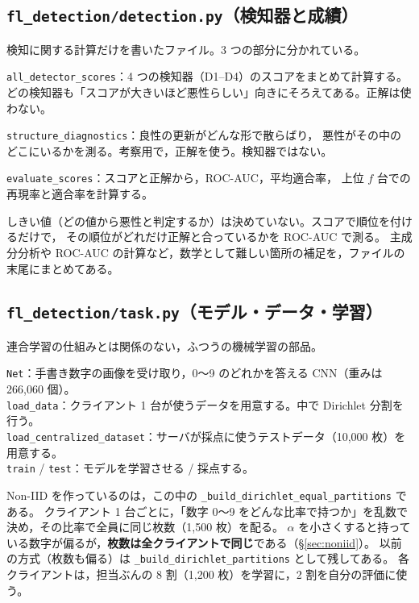\documentclass[a4j, dvipdfmx]{jsarticle}  %
\begin{document}
\subsection{\texttt{fl\_detection/detection.py}（検知器と成績）}

\begin{description}[leftmargin=1.4em, style=nextline]
  \item[役割] 検知に関する計算だけを書いたファイル。3 つの部分に分かれている。
  \item[1) 検知器] \texttt{all\_detector\_scores}：4 つの検知器（D1--D4）のスコアをまとめて計算する。
        どの検知器も「スコアが大きいほど悪性らしい」向きにそろえてある。正解は使わない。
  \item[2) 分布構造の診断指標] \texttt{structure\_diagnostics}：良性の更新がどんな形で散らばり，
        悪性がその中のどこにいるかを測る。考察用で，正解を使う。検知器ではない。
  \item[3) 検知性能指標] \texttt{evaluate\_scores}：スコアと正解から，ROC-AUC，平均適合率，
        上位 $f$ 台での再現率と適合率を計算する。
  \item[要点] しきい値（どの値から悪性と判定するか）は決めていない。スコアで順位を付けるだけで，
        その順位がどれだけ正解と合っているかを ROC-AUC で測る。
        主成分分析や ROC-AUC の計算など，数学として難しい箇所の補足を，ファイルの末尾にまとめてある。
\end{description}

\subsection{\texttt{fl\_detection/task.py}（モデル・データ・学習）}

\begin{description}[leftmargin=1.4em, style=nextline]
  \item[役割] 連合学習の仕組みとは関係のない，ふつうの機械学習の部品。
  \item[主な関数]
        \texttt{Net}：手書き数字の画像を受け取り，0〜9 のどれかを答える CNN（重みは 266{,}060 個）。\\
        \texttt{load\_data}：クライアント 1 台が使うデータを用意する。中で Dirichlet 分割を行う。\\
        \texttt{load\_centralized\_dataset}：サーバが採点に使うテストデータ（10{,}000 枚）を用意する。\\
        \texttt{train} / \texttt{test}：モデルを学習させる / 採点する。
  \item[要点] Non-IID を作っているのは，この中の \texttt{\_build\_dirichlet\_equal\_partitions} である。
        クライアント 1 台ごとに，「数字 0〜9 をどんな比率で持つか」を乱数で決め，その比率で全員に同じ枚数（1{,}500 枚）を配る。
        $\alpha$ を小さくすると持っている数字が偏るが，\textbf{枚数は全クライアントで同じ}である（\S\ref{sec:noniid}）。
        以前の方式（枚数も偏る）は \texttt{\_build\_dirichlet\_partitions} として残してある。
        各クライアントは，担当ぶんの 8 割（1{,}200 枚）を学習に，2 割を自分の評価に使う。
\end{description}
\end{document}

